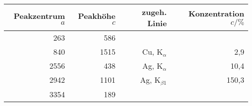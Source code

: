 \begin{tabular}{rrrr}
\toprule
Peakzentrum $a$ & Peakhöhe $c$ & zugeh. Linie & Konzentration $c/\%$ \\
\midrule
263 & 586 & & \\
840 & 1515 & Cu, K$_{\alpha}$ & 2,9 \\
2556 & 438 & Ag, K$_{\alpha}$ & 10,4 \\
2942 & 1101 & Ag, K$_{\beta1}$ & 150,3 \\
3354 & 189 & & \\
\bottomrule
\end{tabular}
